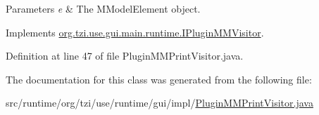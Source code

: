 \begin{DoxyParams}{Parameters}
{\em e} & The M\-Model\-Element object. \\
\hline
\end{DoxyParams}


Implements \hyperlink{interfaceorg_1_1tzi_1_1use_1_1gui_1_1main_1_1runtime_1_1_i_plugin_m_m_visitor_a4a426f6543270da11f1d8b74577f5e02}{org.\-tzi.\-use.\-gui.\-main.\-runtime.\-I\-Plugin\-M\-M\-Visitor}.



Definition at line 47 of file Plugin\-M\-M\-Print\-Visitor.\-java.



The documentation for this class was generated from the following file\-:\begin{DoxyCompactItemize}
\item 
src/runtime/org/tzi/use/runtime/gui/impl/\hyperlink{_plugin_m_m_print_visitor_8java}{Plugin\-M\-M\-Print\-Visitor.\-java}\end{DoxyCompactItemize}
